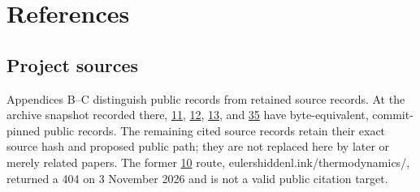 \hypertarget{references}{%
\section*{References}\label{references}}

\hypertarget{project-sources}{%
\subsection*{Project sources}\label{project-sources}}

Appendices B--C distinguish public records from retained source records. At the archive snapshot recorded there, \href{https://github.com/Coppalini-Architecture/coppalini-architecture/blob/9b7122ca5c3712c2c294e2bc5097276d0ba9817b/papers/10\%20THERMODYNAMICS_The_Typed_Root_of_Entropy_v0_2.md}{11}, \href{https://github.com/Coppalini-Architecture/coppalini-architecture/blob/9b7122ca5c3712c2c294e2bc5097276d0ba9817b/papers/13\%20MEMBRANE_MITOCHONDRIA_CHEMIOSMOSIS_ATP_METABOLIC_CONTROL_v0_1.md}{12}, \href{https://github.com/Coppalini-Architecture/coppalini-architecture/blob/9b7122ca5c3712c2c294e2bc5097276d0ba9817b/papers/14\%20DNA_REPLICATION_REPAIR_EXPRESSION_HEREDITARY_MEMORY_v0_1.md}{13}, and \href{https://github.com/Coppalini-Architecture/coppalini-architecture/blob/9b7122ca5c3712c2c294e2bc5097276d0ba9817b/papers/metric-mirror-symmetry-riemanns-i-machine/metric-mirror-symmetry-riemanns-i-machine-2026-09-09.pdf}{35} have byte-equivalent, commit-pinned public records. The remaining cited source records retain their exact source hash and proposed public path; they are not replaced here by later or merely related papers. The former \href{https://chatgpt.com/library?file_id=libfile_37ba8f1902d88191a1ecc5aa2a9514dd\&account_id=personal}{10} route, eulershiddenl.ink/thermodynamics/, returned a 404 on 3 November 2026 and is not a valid public citation target.

